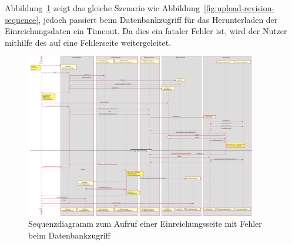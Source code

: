 Abbildung~\ref{fig:upload-revision-sequence-failure} zeigt das gleiche Szenario wie Abbildung~\ref{fig:upload-revision-sequence},
jedoch passiert beim Datenbankzugriff für das Herunterladen der Einreichungsdaten ein Timeout.
Da dies ein fataler Fehler ist, wird der Nutzer mithilfe des  auf eine Fehlerseite weitergeleitet.

\begin{figure}[H]
    \centering
    \includegraphics[width=0.9\textwidth]{graphics/upload_revision_failure}
    \caption{Sequenzdiagramm zum Aufruf einer Einreichungsseite mit Fehler beim Datenbankzugriff}
    \label{fig:upload-revision-sequence-failure}
\end{figure}
